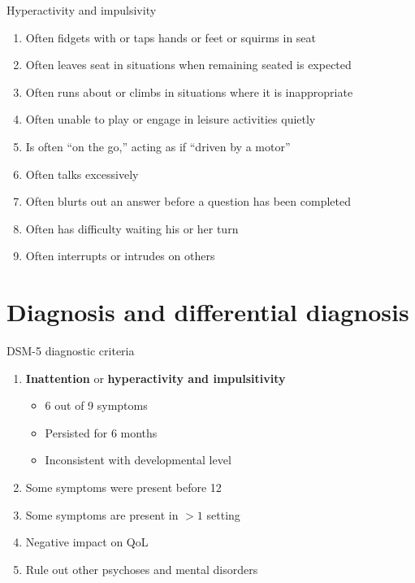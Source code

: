 \documentclass{beamer}
\begin{document}
\begin{frame}{Hyperactivity and impulsivity}
\begin{enumerate}
    \item Often fidgets with or taps hands or feet or squirms in seat
    \item Often leaves seat in situations when remaining seated is expected
    \item Often runs about or climbs in situations where it is inappropriate
    \item Often unable to play or engage in leisure activities quietly
    \item Is often ``on the go,'' acting as if ``driven by a motor''
    \item Often talks excessively
    \item Often blurts out an answer before a question has been completed
    \item Often has difficulty waiting his or her turn
    \item Often interrupts or intrudes on others
\end{enumerate}
\end{frame}

\section{Diagnosis and differential diagnosis}
\begin{frame}{DSM-5 diagnostic criteria}
\begin{enumerate}
    \item \textbf{Inattention} or \textbf{hyperactivity and impulsitivity}
        \begin{itemize}
            \item 6 out of 9 symptoms
            \item Persisted for 6 months
            \item Inconsistent with developmental level
        \end{itemize}
    \item Some symptoms were present before 12
    \item Some symptoms are present in $>1$ setting
    \item Negative impact on QoL
    \item Rule out other psychoses and mental disorders
\end{enumerate}
\end{frame}
\end{document}
